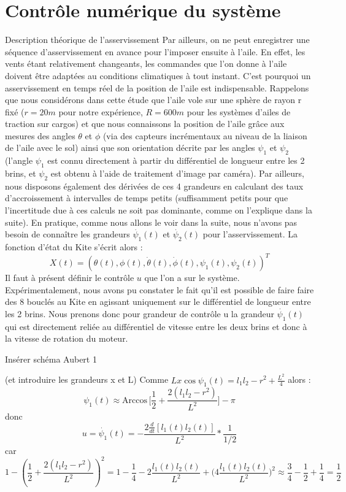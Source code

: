 \documentclass[a4paper,twoside,12pt]{article}
\newcounter{partie}
\newcounter{sous-partie}
\newenvironment{partie}[1]
{
\section{#1}
}
{

}
\newenvironment{sous-partie}[1]
{
\subsection{#1}
}
{

}
\renewcommand{\arccos}{\mathrm{Arccos}\,}
\begin{document}
\begin{partie}{Contrôle numérique du système}
\begin{sous-partie}{Description théorique de l'asservissement}
\newline
Par ailleurs, on ne peut enregistrer une séquence d'asservissement en avance pour l'imposer ensuite à l'aile. %
En effet, les vents étant relativement changeants, les commandes que l'on donne à l'aile doivent être adaptées au conditions climatiques à tout instant.
\newline
C'est pourquoi un asservissement en temps réel de la position de l'aile est indispensable.
Rappelons que nous considérons dans cette étude que l'aile vole sur une sphère de rayon r fixé ($r=20m$ pour notre expérience, $R=600 m$ pour les systèmes d'ailes de traction sur cargos) et que nous connaissons la position de l'aile grâce aux mesures des angles $\theta$ et $\phi$ (via des capteurs incrémentaux au niveau de la liaison de l'aile avec le sol) ainsi que son orientation décrite par les angles $\psi_1$ et $\psi_2$ (l'angle  $\psi_1$ est connu directement à partir du différentiel de longueur entre les 2 brins, et $\psi_2$ est obtenu à l'aide de traitement d'image par caméra).
Par ailleurs, nous disposons également des dérivées de ces 4 grandeurs en calculant des taux d'accroissement à intervalles de temps petits (suffisamment petits pour que l'incertitude due à ces calculs ne soit pas dominante, comme on l'explique dans la suite). %
En pratique, comme nous allons le voir dans la suite, nous n'avons pas besoin de connaître les grandeurs $\dot{\psi_1}(t)$ et $\dot{\psi_2}(t)$ pour l'asservissement.
\newline
La fonction d'état du Kite s'écrit alors :
$$X(t)=(\theta(t),\phi(t),\dot{\theta}(t),\dot{\phi}(t),\psi_1(t), \psi_2(t))^T$$
Il faut à présent définir le contrôle $u$ que l'on a sur le système. %
Expérimentalement, nous avons pu constater le fait qu'il est possible de faire faire des 8 bouclés au Kite en agissant uniquement sur le différentiel de longueur entre les 2 brins. %
Nous prenons donc pour grandeur de contrôle u la grandeur $\dot{\psi_1}(t)$ qui est directement reliée au différentiel de vitesse entre les deux brins et donc à la vitesse de rotation du moteur.
\newline
\begin{huge}
Insérer schéma Aubert 1 
\end{huge}
(et introduire les grandeurs x et L)
\newline
Comme $L x \cos \psi_1(t) = l_1 l_2 -r^2 +\frac{L^2}{4}$ alors : $$\psi_1(t) \approx \arccos \big[\frac{1}{2} + \frac{2(l_1 l_2-r^2)}{L^2}\big]-\pi$$ donc
$$u = \dot{\psi_1}(t)= -\frac{2\frac{d}{dt}[l_1(t) l_2(t)]}{L^2}* \frac{1}{1/2}$$ car $$1-(\frac{1}{2} + \frac{2(l_1 l_2-r^2)}{L^2})^2 = 1-\frac{1}{4} - 2 \frac{l_1(t)l_2(t)}{L^2} + \big(4 \frac{l_1(t)l_2(t)}{L^2}\big)^2 \approx \frac{3}{4}-\frac{1}{2} + \frac{1}{4}= \frac{1}{2}$$

\end{sous-partie}
\end{partie}
\end{document}
